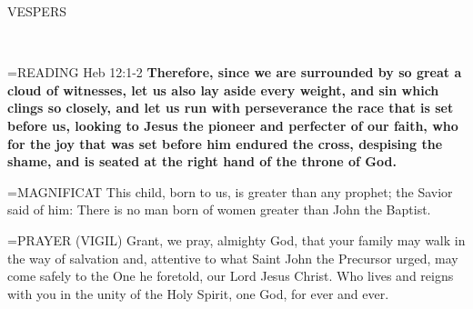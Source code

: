 \begin{flushleft}\normalsize \begin{flushleft}\normalsize VESPERS\\\end{flushleft}\\\end{flushleft}

\hangindent=\parindent \small{READING} Heb 12:1-2 \textbf{Therefore, since we are surrounded by so great a
cloud of witnesses, let us also lay aside every weight, and sin which
clings so closely, and let us run with perseverance the race that is set
before us, looking to Jesus the pioneer and perfecter of our faith,
who for the joy that was set before him endured the cross, despising
the shame, and is seated at the right hand of the throne of God.\\}
 
\hangindent=\parindent \small{MAGNIFICAT  This child, born to us, is greater than any prophet; the
Savior said of him: There is no man born of women greater than
John the Baptist.\\}
 
\hangindent=\parindent \small{PRAYER 
(VIGIL) Grant, we pray, almighty God,
that your family may walk in the way of salvation
and, attentive to what Saint John the Precursor urged,
may come safely to the One he foretold,
our Lord Jesus Christ.
Who lives and reigns with you in the unity of the Holy Spirit,
one God, for ever and ever.\\}
 
